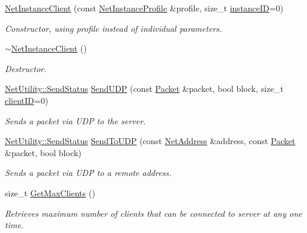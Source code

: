 \begin{DoxyCompactItemize}
\hyperlink{class_net_instance_client_a0e7b8b830889578da1f5fd3d89dc08bb}{NetInstanceClient} (const \hyperlink{class_net_instance_profile}{NetInstanceProfile} \&profile, size\_\-t \hyperlink{class_net_instance_a46bab6fc672f987ee3c52daabffe34f7}{instanceID}=0)
\begin{DoxyCompactList}\small\item\em Constructor, using profile instead of individual parameters. \item\end{DoxyCompactList}\item 
\hyperlink{class_net_instance_client_aa5b7843b4ca224e1f20a489050a40e19}{$\sim$NetInstanceClient} ()
\begin{DoxyCompactList}\small\item\em Destructor. \item\end{DoxyCompactList}\item 
\hyperlink{class_net_utility_a8051eca61204ffd818281419bbf44736}{NetUtility::SendStatus} \hyperlink{class_net_instance_client_abf711774516cb172ff615894c9d7a8e1}{SendUDP} (const \hyperlink{class_packet}{Packet} \&packet, bool block, size\_\-t \hyperlink{class_net_instance_client_abc188a88da7ab851bc3ac4d9287fe342}{clientID}=0)
\begin{DoxyCompactList}\small\item\em Sends a packet via UDP to the server. \item\end{DoxyCompactList}\item 
\hyperlink{class_net_utility_a8051eca61204ffd818281419bbf44736}{NetUtility::SendStatus} \hyperlink{class_net_instance_client_a890f6f61e7a48a642fdaa232a86f08f1}{SendToUDP} (const \hyperlink{class_net_address}{NetAddress} \&address, const \hyperlink{class_packet}{Packet} \&packet, bool block)
\begin{DoxyCompactList}\small\item\em Sends a packet via UDP to a remote address. \item\end{DoxyCompactList}\item 
size\_\-t \hyperlink{class_net_instance_client_abc531c75e610e232efe67d5fcbc1dae4}{GetMaxClients} ()
\begin{DoxyCompactList}\small\item\em Retrieves maximum number of clients that can be connected to server at any one time. \item\end{DoxyCompactList}\item 

\end{DoxyCompactItemize}
